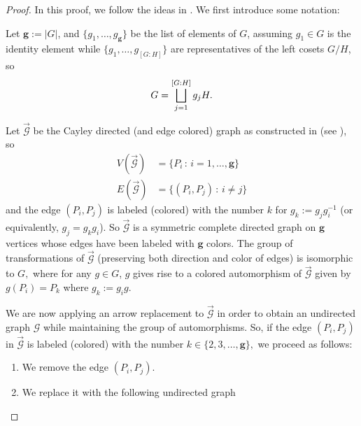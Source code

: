\documentclass{amsart}
\theoremstyle{definition}
\theoremstyle{remark}
\begin{document}
\begin{proof}
In this proof, we follow the ideas in \cite[Section 2]{Fr39}. We first introduce some notation:

Let $\mathbf{g}:=|G|$, and $\{g_1,\ldots,g_\mathbf{g}\}$ be the list of elements of $G$, assuming $g_1\in G$ is the identity element while $\{g_1,\ldots ,g_{[G:H]}\}$ are representatives of the left cosets $G/H$, so
    $$G=\operatornamewithlimits{\bigsqcup}_{j=1}^{[G:H]} g_jH.$$  
    
    Let   
    $\overrightarrow{\mathcal{G}}$ be the Cayley directed (and edge colored) graph as constructed in \cite[Chapter VIII, \S 5]{Konig} (see \cite[Schritt 1), pp.\ 242--243]{Fr39}), so
    \begin{align*}
        V(\overrightarrow{\mathcal{G}}) &=\{ P_i\,:\, i=1,\ldots, \mathbf{g}\}\\
        E(\overrightarrow{\mathcal{G}}) &=\{ (P_i,P_j)\,:\, i\ne j\}
    \end{align*}
    and the edge $(P_i,P_j)$ is labeled (colored) with the number $k$ for $g_k:=g_jg_i^{-1}$ (or equivalently, $g_j=g_kg_i$). So  $\overrightarrow{\mathcal{G}}$ is a symmetric complete directed graph on $\mathbf{g}$ vertices whose edges have been labeled with $\mathbf{g}$ colors.  The group of transformations of $\overrightarrow{\mathcal{G}}$ (preserving both direction and color of edges) is isomorphic to $G,$ where for any $g\in G$, $g$ gives rise to a colored automorphism of $\overrightarrow{\mathcal{G}}$ given by $g(P_i)=P_k$ where $g_k:=g_ig$. 

    We are now applying an arrow replacement to $\overrightarrow{\mathcal{G}}$ in order to obtain an undirected graph $\mathcal{G}$ while maintaining the group of automorphisms. So, if the edge $(P_i,P_j)$ in $\overrightarrow{\mathcal{G}}$ is labeled (colored) with the number $k\in\{2,3,…,\mathbf{g}\},$ we proceed as follows:
\begin{enumerate}
    \item We remove the edge $(P_i,P_j)$.
    \item We replace it with the following undirected graph
    \begin{center}
\end{center}
\end{enumerate}
\end{proof}
\end{document}
